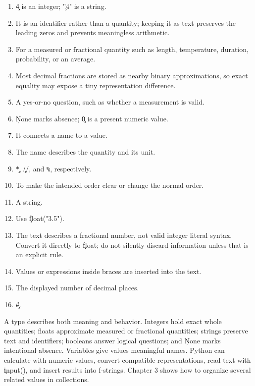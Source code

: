 \begin{enumerate}
    \item \c{4} is an integer; \c{"4"} is a string.
    \item It is an identifier rather than a quantity; keeping it as text
          preserves the leading zeros and prevents meaningless arithmetic.
    \item For a measured or fractional quantity such as length, temperature,
          duration, probability, or an average.
    \item Most decimal fractions are stored as nearby binary approximations,
          so exact equality may expose a tiny representation difference.
    \item A yes-or-no question, such as whether a measurement is valid.
    \item \c{None} marks absence; \c{0} is a present numeric value.
    \item It connects a name to a value.
    \item The name describes the quantity and its unit.
    \item \c{*}, \c{//}, and \texttt{\%}, respectively.
    \item To make the intended order clear or change the normal order.
    \item A string.
    \item Use \c{float("3.5")}.
    \item The text describes a fractional number, not valid integer literal
          syntax. Convert it directly to \c{float}; do not silently discard
          information unless that is an explicit rule.
    \item Values or expressions inside braces are inserted into the text.
    \item The displayed number of decimal places.
    \item \c{#}.
\end{enumerate}

\begin{tcolorbox}[title=Chapter summary,colframe=orange,colback=white,arc=2mm]
A type describes both meaning and behavior. Integers hold exact whole
quantities; floats approximate measured or fractional quantities; strings
preserve text and identifiers; booleans answer logical questions; and
\c{None} marks intentional absence. Variables give values meaningful names.
Python can calculate with numeric values, convert compatible representations,
read text with \c{input()}, and insert results into f-strings. Chapter 3 shows
how to organize several related values in collections.
\end{tcolorbox}


